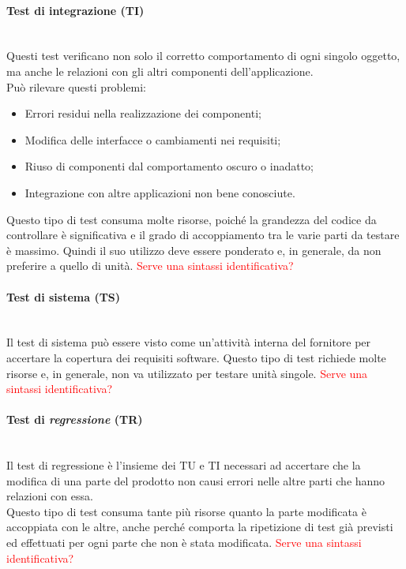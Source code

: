 	\paragraph{\textbf{Test di integrazione (TI)}}
	~\\Questi test verificano non solo il corretto comportamento di ogni singolo oggetto, 
	ma anche le relazioni con gli altri componenti dell'applicazione.
	~\\Può rilevare questi problemi:
	\begin{itemize}
		\item Errori residui nella realizzazione dei componenti;
		\item Modifica delle interfacce o cambiamenti nei requisiti;
		\item Riuso di componenti dal comportamento oscuro o inadatto;
		\item Integrazione con altre applicazioni non bene conosciute.
	\end{itemize}
	Questo tipo di test consuma molte risorse, poiché la grandezza del codice da controllare è 
	significativa e	il grado di accoppiamento tra le varie parti da testare è massimo. 
	Quindi il suo utilizzo deve essere ponderato e, in generale, da non preferire a quello di unità.
	\textcolor{red}{Serve una sintassi identificativa?}
	\paragraph{\textbf{Test di sistema (TS)}}
	~\\Il test di sistema può essere visto come un'attività interna del fornitore
	per accertare la copertura dei requisiti software.
	\newline{}Questo tipo di test richiede molte risorse e, in generale, non va utilizzato per testare
	unità singole.
	\textcolor{red}{Serve una sintassi identificativa?}
	\paragraph{\textbf{Test di \emph{regressione}} \textbf{(TR)}}
	~\\Il test di regressione è l'insieme dei TU e TI necessari ad accertare che la modifica
	di una parte del prodotto non causi errori nelle altre parti che hanno relazioni con essa.
	\\Questo tipo di test consuma tante più risorse quanto la parte modificata è accoppiata con le altre, 
	anche perché comporta la ripetizione di test già previsti ed effettuati per ogni parte che non è 
	stata modificata.
	\textcolor{red}{Serve una sintassi identificativa?}
